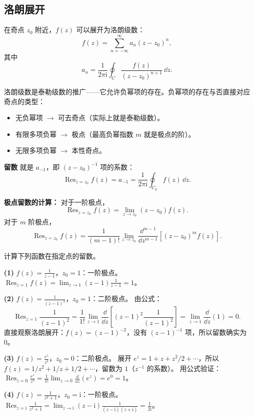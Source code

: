 \subsection{洛朗展开}

在奇点 $z_0$ 附近，$f(z)$ 可以展开为洛朗级数：
\begin{equation}
f(z) = \sum_{n=-\infty}^{\infty} a_n (z-z_0)^n,
\end{equation}
其中
\begin{equation}
a_n = \frac{1}{2\pi\mathrm{i}}\oint_C \frac{f(z)}{(z-z_0)^{n+1}}\,\dd z.
\end{equation}

洛朗级数是泰勒级数的推广——它允许负幂项的存在。负幂项的存在与否直接对应奇点的类型：
\begin{itemize}
\item 无负幂项 $\to$ 可去奇点（实际上就是泰勒级数）。
\item 有限多项负幂 $\to$ 极点（最高负幂指数 $m$ 就是极点的阶）。
\item 无限多项负幂 $\to$ 本性奇点。
\end{itemize}

\textbf{留数} 就是 $a_{-1}$，即 $(z-z_0)^{-1}$ 项的系数：
\begin{equation}
\mathop{\mathrm{Res}}_{z=z_0} f(z) = a_{-1}
= \frac{1}{2\pi\mathrm{i}}\oint_{C_0} f(z)\,\dd z.
\label{eq:residue_def}
\end{equation}

\textbf{极点留数的计算：} 对于一阶极点，
\begin{equation}
\mathop{\mathrm{Res}}_{z=z_0} f(z) = \lim_{z\to z_0} (z-z_0)f(z).
\end{equation}
对于 $m$ 阶极点，
\begin{equation}
\mathop{\mathrm{Res}}_{z=z_0} f(z)
= \frac{1}{(m-1)!}\lim_{z\to z_0}
\frac{\dd^{m-1}}{\dd z^{m-1}}\left[(z-z_0)^m f(z)\right].
\label{eq:residue_pole}
\end{equation}

\begin{example}[留数计算练习]
计算下列函数在指定点的留数。

\textbf{(1)} $f(z) = \frac{1}{z-1}$，$z_0=1$：一阶极点。
$\mathop{\mathrm{Res}}_{z=1} f(z) = \lim_{z\to 1} (z-1)\frac{1}{z-1} = 1$。

\textbf{(2)} $f(z) = \frac{1}{(z-1)^2}$，$z_0=1$：二阶极点。
由公式：
\[
\mathop{\mathrm{Res}}_{z=1}\frac{1}{(z-1)^2}
= \frac{1}{1!}\lim_{z\to1}\frac{\dd}{\dd z}\left[(z-1)^2\frac{1}{(z-1)^2}\right]
= \lim_{z\to1}\frac{\dd}{\dd z}(1)=0.
\]
直接观察洛朗展开：$f(z) = (z-1)^{-2}$，没有 $(z-1)^{-1}$ 项，所以留数确实为 $0$。

\textbf{(3)} $f(z) = \frac{e^z}{z^2}$，$z_0=0$：二阶极点。
展开 $e^z = 1 + z + z^2/2 + \cdots$，所以 $f(z) = 1/z^2 + 1/z + 1/2 + \cdots$，留数为 $1$（$z^{-1}$ 的系数）。
用公式验证：$\mathop{\mathrm{Res}}_{z=0}\frac{e^z}{z^2} = \frac{1}{1!}\lim_{z\to0}\frac{\dd}{\dd z}(e^z) = e^0 = 1$。

\textbf{(4)} $f(z) = \frac{1}{z^2+1}$，$z_0=\mathrm{i}$：一阶极点。
$\mathop{\mathrm{Res}}_{z=\mathrm{i}}\frac{1}{z^2+1} = \lim_{z\to\mathrm{i}} (z-\mathrm{i})\frac{1}{(z-\mathrm{i})(z+\mathrm{i})} = \frac{1}{2\mathrm{i}}$。
\end{example}


